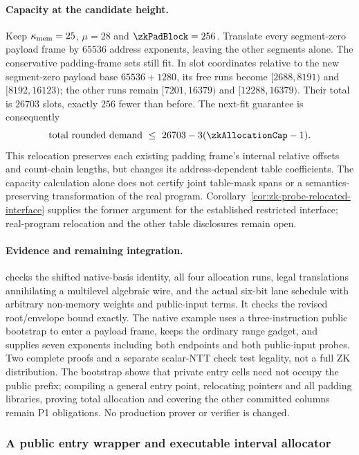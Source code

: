 \paragraph{Capacity at the candidate height.} Keep $\kappa_{\mathrm{mem}}=25$, $\mu=28$ and $\zkPadBlock=256$. Translate every segment-zero payload frame by $65536$ address exponents, leaving the other segments alone. The conservative padding-frame sets still fit. In slot coordinates relative to the new segment-zero payload base $65536+1280$, its free runs become $[2688,8191)$ and $[8192,16123)$; the other runs remain $[7201,16379)$ and $[12288,16379)$. Their total is $26703$ slots, exactly $256$ fewer than before. The next-fit guarantee is consequently
\[
 \text{total rounded demand}\ \le\ 26703-3(\zkAllocationCap-1).
\]
This relocation preserves each existing padding frame's internal relative offsets and count-chain lengths, but changes its address-dependent table coefficients. The capacity calculation alone does not certify joint table-mask spans or a semantics-preserving transformation of the real program. Corollary~\ref{cor:zk-probe-relocated-interface} supplies the former argument for the established restricted interface; real-program relocation and the other table disclosures remain open.

\paragraph{Evidence and remaining integration.}  checks the shifted native-basis identity, all four allocation runs, legal translations annihilating a multilevel algebraic wire, and the actual six-bit lane schedule with arbitrary non-memory weights and public-input terms. It checks the revised root/envelope bound exactly. The native example  uses a three-instruction public bootstrap to enter a payload frame, keeps the ordinary range gadget, and supplies seven exponents including both endpoints and both public-input probes. Two complete proofs and a separate scalar-NTT check test legality, not a full ZK distribution. The bootstrap shows that private entry cells need not occupy the public prefix; compiling a general entry point, relocating pointers and all padding libraries, proving total allocation and covering the other committed columns remain P1 obligations. No production prover or verifier is changed.

\subsubsection{A public entry wrapper and executable interval allocator}

